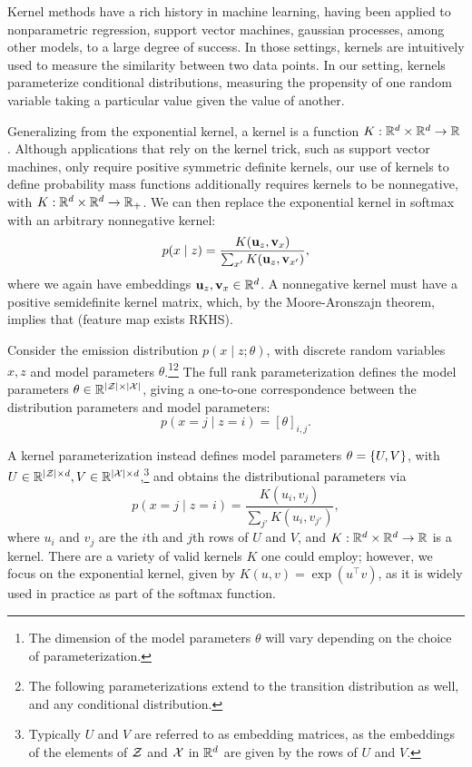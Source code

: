 \documentclass{article}
\begin{document}
Kernel methods have a rich history in machine learning,
having been applied to nonparametric regression, support vector machines, gaussian processes,
among other models, to a large degree of success.
In those settings, kernels are intuitively used to measure the similarity between two data points.
In our setting, kernels parameterize conditional distributions,
measuring the propensity of one random variable taking a particular value given
the value of another.

Generalizing from the exponential kernel,
a kernel is a function $K: \mathbb{R}^d\times\mathbb{R}^d\to\mathbb{R}$.
Although applications that rely on the kernel trick, such as support vector machines,
only require positive symmetric definite kernels,
our use of kernels to define probability mass functions additionally requires
kernels to be nonnegative, with $K: \mathbb{R}^d\times\mathbb{R}^d\to\mathbb{R}_+$.
We can then replace the exponential kernel in softmax with
an arbitrary nonnegative kernel:
$$p(x \mid z) = \frac{K(\mathbf{u}_z, \mathbf{v}_x)}{\sum_{x'} K(\mathbf{u}_z, \mathbf{v}_{x'})},$$
where we again have embeddings $\mathbf{u}_z,\mathbf{v}_x\in\mathbb{R}^d$.
A nonnegative kernel must have a positive semidefinite kernel matrix,
which, by the Moore-Aronszajn theorem, implies that (feature map exists RKHS).

Consider the emission distribution $p(x \mid z; \theta)$,
with discrete random variables $x,z$ and model parameters $\theta$.\footnote{
The dimension of the model parameters $\theta$ will vary depending on the choice
of parameterization.}\footnote{
The following parameterizations extend to the transition distribution as well,
and any conditional distribution.}
The full rank parameterization defines the model parameters $\theta\in\mathbb{R}^{|\mathcal{Z}|\times|\mathcal{X}|}$,
giving a one-to-one correspondence between the distribution parameters and model parameters:
$$p(x=j \mid z=i) = [\theta]_{i,j}.$$

A kernel parameterization instead defines model parameters $\theta = \left\{U,V\right\}$,
with $U\in\mathbb{R}^{|\mathcal{Z}|\times d},V\in\mathbb{R}^{|\mathcal{X}|\times d}$,\footnote{
Typically $U$ and $V$ are referred to as embedding matrices,
as the embeddings of the elements of $\mathcal{Z}$ and $\mathcal{X}$ in $\mathbb{R}^d$ are given by 
the rows of $U$ and $V$.
} and obtains the distributional
parameters via
$$p(x=j \mid z=i) = \frac{K(u_i, v_j)}{\sum_{j'} K(u_i, v_{j'})},$$
where $u_i$ and $v_j$ are the $i$th and $j$th rows of $U$ and $V$,
and $K: \mathbb{R}^d \times \mathbb{R}^d \to \mathbb{R}$ is a kernel.
There are a variety of valid kernels $K$ one could employ;
however, we focus on the exponential kernel, given by $K(u, v) = \exp(u^\top v)$,
as it is widely used in practice as part of the softmax function.
\end{document}
